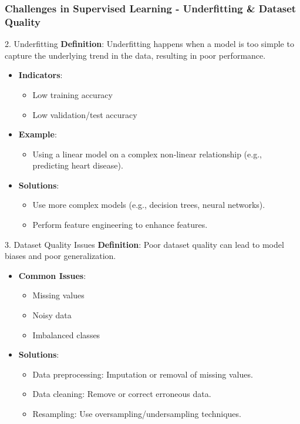 \documentclass[aspectratio=169]{beamer}
\begin{document}
\begin{frame}[fragile]
    \frametitle{Challenges in Supervised Learning - Underfitting \& Dataset Quality}
    \begin{block}{2. Underfitting}
        \textbf{Definition}: Underfitting happens when a model is too simple to capture the underlying trend in the data, resulting in poor performance.
    \end{block}
    \begin{itemize}
        \item \textbf{Indicators}:
        \begin{itemize}
            \item Low training accuracy
            \item Low validation/test accuracy
        \end{itemize}
        \item \textbf{Example}:
        \begin{itemize}
            \item Using a linear model on a complex non-linear relationship (e.g., predicting heart disease).
        \end{itemize}
        \item \textbf{Solutions}:
        \begin{itemize}
            \item Use more complex models (e.g., decision trees, neural networks).
            \item Perform feature engineering to enhance features.
        \end{itemize}
    \end{itemize}
    
    \begin{block}{3. Dataset Quality Issues}
        \textbf{Definition}: Poor dataset quality can lead to model biases and poor generalization.
    \end{block}
    \begin{itemize}
        \item \textbf{Common Issues}:
        \begin{itemize}
            \item Missing values
            \item Noisy data
            \item Imbalanced classes
        \end{itemize}
        \item \textbf{Solutions}:
        \begin{itemize}
            \item Data preprocessing: Imputation or removal of missing values.
            \item Data cleaning: Remove or correct erroneous data.
            \item Resampling: Use oversampling/undersampling techniques.
        \end{itemize}
    \end{itemize}
\end{frame}
\end{document}
